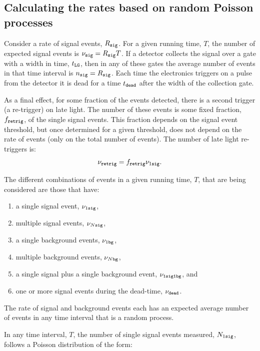 \documentclass[twocolumn]{bmcart}
\begin{document}
\begin{backmatter}
\subsection{Calculating the rates based on random Poisson processes}

Consider a rate of signal events, $R_{\tt sig}$.  For a given running
time, $T$, the number of expected signal events is $\nu_{\tt sig} =
R_{\tt sig} T$.  If a detector collects the signal over a gate with a
width in time, $t_{\tt LG}$, then in any of these gates the average
number of events in that time interval is $n_{\tt sig} = R_{\tt sig}$.
Each time the electronics triggers on a pulse from the detector it is
dead for a time $t_{\tt dead}$ after the width of the collection gate.

As a final effect, for some fraction of the events detected, there is
a second trigger (a re-trigger) on late light.  The number of these
events is some fixed fraction, $f_{\tt retrig}$, of the single signal
events.  This fraction depends on the signal event threshold, but once
determined for a given threshold, does not depend on the rate of
events (only on the total number of events).  The number of late light
re-triggers is:
\begin{equation}\label{eq:retrig}
\nu_{\tt retrig} = f_{\tt retrig} \nu_{1\tt sig}.
\end{equation}

The different combinations of events in a given running time, $T$,
that are being considered are those that have:
\begin{enumerate}
\item a single signal event, $\nu_{1\tt sig}$,     
\item multiple signal events, $\nu_{N\tt sig}$,    
\item a single background events, $\nu_{1\tt bg}$,
\item multiple background events, $\nu_{N\tt bg}$,
\item a single signal plus a single background event, $\nu_{\tt 1 sig 1 bg}$, and
\item one or more signal events during the dead-time, $\nu_{\tt dead}$. 
\end{enumerate}
The rate of signal and background events each has an expected average
number of events in any time interval that is a random process.

In any time interval, $T$, the number of single signal events
measured, $N_{1\tt sig}$, follows a Poisson distribution of the form:


\end{backmatter}
\end{document}
